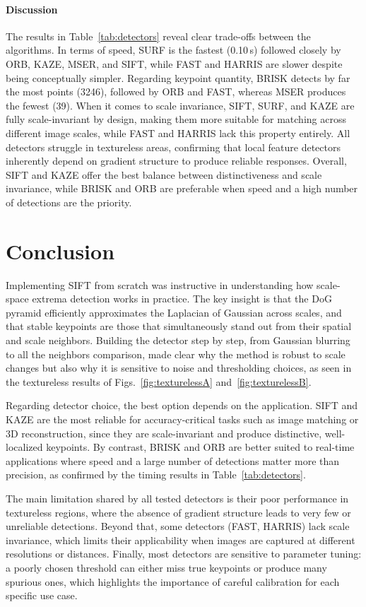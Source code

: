 \documentclass{article}
\begin{document}
\paragraph{Discussion}
The results in Table~\ref{tab:detectors} reveal clear trade-offs between the algorithms. 
In terms of speed, SURF is the fastest (0.10\,s) followed closely by ORB, KAZE, MSER, 
and SIFT, while FAST and HARRIS are slower despite being conceptually simpler. 
Regarding keypoint quantity, BRISK detects by far the most points (3246), followed by 
ORB and FAST, whereas MSER produces the fewest (39). When it comes to scale invariance, 
SIFT, SURF, and KAZE are fully scale-invariant by design, making them more suitable for 
matching across different image scales, while FAST and HARRIS lack this property entirely. 
All detectors struggle in textureless areas, confirming that local feature detectors 
inherently depend on gradient structure to produce reliable responses. Overall, SIFT and 
KAZE offer the best balance between distinctiveness and scale invariance, while BRISK and 
ORB are preferable when speed and a high number of detections are the priority.


\section{Conclusion}

Implementing SIFT from scratch was instructive in understanding how scale-space extrema 
detection works in practice. The key insight is that the DoG pyramid efficiently 
approximates the Laplacian of Gaussian across scales, and that stable keypoints are those 
that simultaneously stand out from their spatial and scale neighbors. Building the detector 
step by step, from Gaussian blurring to all the neighbors comparison, made clear why 
the method is robust to scale changes but also why it is sensitive to noise and 
thresholding choices, as seen in the textureless results of Figs.~\ref{fig:texturelessA} 
and~\ref{fig:texturelessB}.

Regarding detector choice, the best option depends on the application. SIFT and KAZE 
are the most reliable for accuracy-critical tasks such as image matching or 3D 
reconstruction, since they are scale-invariant and produce distinctive, well-localized 
keypoints. By contrast, BRISK and ORB are better suited to real-time applications where 
speed and a large number of detections matter more than precision, as confirmed by the 
timing results in Table~\ref{tab:detectors}.

The main limitation shared by all tested detectors is their poor performance in 
textureless regions, where the absence of gradient structure leads to very few or 
unreliable detections. Beyond that, some detectors (FAST, HARRIS) lack scale invariance, 
which limits their applicability when images are captured at different resolutions or 
distances. Finally, most detectors are sensitive to parameter tuning: a poorly chosen 
threshold can either miss true keypoints or produce many spurious ones, which highlights 
the importance of careful calibration for each specific use case.





\end{document}
